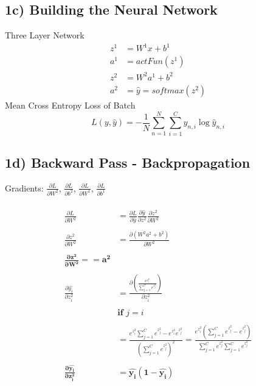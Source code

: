 \documentclass{article}
\begin{document}
\subsection*{1c) Building the Neural Network}
Three Layer Network
\begin{align}
	z^{1} &= W^{1}x + b^{1}\\
	a^{1} &=actFun(z^{1})\\
	z^{2} &=W^{2}a^{1}+b^{2}\\
	a^{2} &=\hat{y}=softmax(z^{2})
\end{align}
Mean Cross Entropy Loss of Batch
\begin{equation}
	L(y,\hat{y}) = -\frac{1}{N}\sum_{n=1}^{N}\sum_{i=1}^{C}y_{n,i}\log{\hat{y}_{n,i}}
\end{equation}

\subsection*{1d) Backward Pass - Backpropagation}
Gradients: $\frac{\partial L}{\partial W^{2}}$, $\frac{\partial L}{\partial b^{2}}$, $\frac{\partial L}{\partial W^{1}}$, $\frac{\partial L}{\partial b^{1}}$\\ \\
	\begin{align*}
		\frac{\partial L}{\partial W^{2}} &= \frac{\partial L}{\partial \hat{y}}\frac{\partial \hat{y}}{\partial z^{2}}\frac{\partial z^{2}}{\partial W^{2}}\\ \\
		\frac{\partial z^{2}}{\partial W^{2}} &= \frac{\partial (W^{2}a^{2}+b^{2})}{\partial W^{2}}\\ \\
		\boldsymbol{\frac{\partial z^{2}}{\partial W^{2}}}= \boldsymbol{=a^{2}}
	\\
	\\
		\frac{\partial \hat{y_i}}{\partial z_i^{2}} &= \frac{\partial \left(\frac{e^{z_i^2}}{\sum_{j=1}^Ce^{z_j^2}}\right)}{\partial z_i^2}\\ \\
		&  \textbf{if }   j = i\\ \\		
		& = \frac{e^{z_i^2}\sum_{j=1}^Ce^{z_j^2}-e^{z_i^2}e^{z_j^2}}{\left(\sum_{j=1}^Ce^{z_j^2}\right)^2} = \frac{e^{z_i^2}(\sum_{j=1}^Ce^{z_j^2}-e^{z_j^2})}{\sum_{j=1}^Ce^{z_j^2}\sum_{j=1}^Ce^{z_j^2}}\\ \\
		\boldsymbol{\frac{\partial \hat{y_i}}{\partial z_i^{2}}} & \boldsymbol{=\hat{y_i}(1-\hat{y_i})}
	\end{align*}
\end{document}
